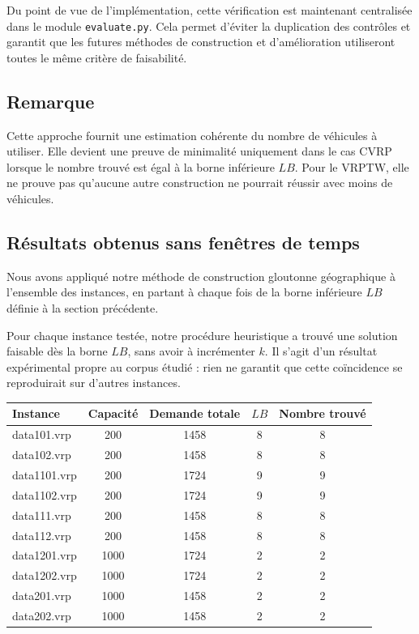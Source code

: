 \documentclass[11pt,a4paper]{article}
\begin{document}
Du point de vue de l'implémentation, cette vérification est maintenant centralisée dans le module \texttt{evaluate.py}. Cela permet d'éviter la duplication des contrôles et garantit que les futures méthodes de construction et d'amélioration utiliseront toutes le même critère de faisabilité.

\subsection{Remarque}
Cette approche fournit une estimation cohérente du nombre de véhicules à utiliser. Elle devient une preuve de minimalité uniquement dans le cas CVRP lorsque le nombre trouvé est égal à la borne inférieure \(LB\). Pour le VRPTW, elle ne prouve pas qu'aucune autre construction ne pourrait réussir avec moins de véhicules.

\subsection{Résultats obtenus sans fenêtres de temps}
Nous avons appliqué notre méthode de construction gloutonne géographique à l'ensemble des instances, en partant à chaque fois de la borne inférieure $LB$ définie à la section précédente.

Pour chaque instance testée, notre procédure heuristique a trouvé une solution faisable dès la borne $LB$, sans avoir à incrémenter $k$. Il s'agit d'un résultat expérimental propre au corpus étudié : rien ne garantit que cette coïncidence se reproduirait sur d'autres instances.

\begin{center}
\begin{tabular}{lcccc}
\toprule
Instance & Capacité & Demande totale & \(LB\) & Nombre trouvé \\
\midrule
data101.vrp  & 200  & 1458 & 8 & 8 \\
data102.vrp  & 200  & 1458 & 8 & 8 \\
data1101.vrp & 200  & 1724 & 9 & 9 \\
data1102.vrp & 200  & 1724 & 9 & 9 \\
data111.vrp  & 200  & 1458 & 8 & 8 \\
data112.vrp  & 200  & 1458 & 8 & 8 \\
data1201.vrp & 1000 & 1724 & 2 & 2 \\
data1202.vrp & 1000 & 1724 & 2 & 2 \\
data201.vrp  & 1000 & 1458 & 2 & 2 \\
data202.vrp  & 1000 & 1458 & 2 & 2 \\
\bottomrule
\end{tabular}
\end{center}
\end{document}

